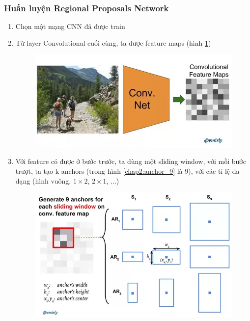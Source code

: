 \subsubsection{Huấn luyện Regional Proposals Network}
\begin{enumerate}
    \item Chọn một mạng CNN đã được train
    \item Từ layer Convolutional cuối cùng, ta được feature maps (hình \ref{chap2:last_convo})
    \begin{center}
    \begin{figure}[H]
    \centering
    \includegraphics[width=0.7\columnwidth]{images/chap2/step-1.png}
    \label{chap2:last_convo}
    \end{figure}
    \end{center}
    \item Với feature có được ở bước trước, ta dùng một sliding window, với mỗi bước trượt, ta tạo k anchors (trong hình \ref{chap2:anchor_9} là 9), với các tỉ lệ đa dạng (hình vuông, $1 \times 2$, $2 \times 1$, ...)\\
    \begin{center}
    \begin{figure}[H]
    \centering
    \includegraphics[width=0.7\columnwidth]{images/chap2/step-2.png}

\end{figure}
\end{center}
\end{enumerate}
